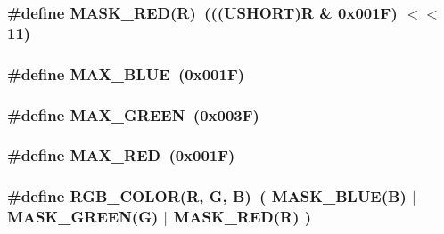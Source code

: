 \subsubsection[{MASK\_\-RED}]{\setlength{\rightskip}{0pt plus 5cm}\#define MASK\_\-RED(R)~(((USHORT)R \& 0x001F) $<$$<$ 11)}\label{colorspace_8h_ab7804c4ff0e1de4a1d3995e5acf43f52}
\subsubsection[{MAX\_\-BLUE}]{\setlength{\rightskip}{0pt plus 5cm}\#define MAX\_\-BLUE~(0x001F)}\label{colorspace_8h_af52029ba81d9147df7146fe94035f92a}
\subsubsection[{MAX\_\-GREEN}]{\setlength{\rightskip}{0pt plus 5cm}\#define MAX\_\-GREEN~(0x003F)}\label{colorspace_8h_a91990e7d5a79c882024a62d99ef5487e}
\subsubsection[{MAX\_\-RED}]{\setlength{\rightskip}{0pt plus 5cm}\#define MAX\_\-RED~(0x001F)}\label{colorspace_8h_a3b064aa13c00b6ee4da701437561e631}
\subsubsection[{RGB\_\-COLOR}]{\setlength{\rightskip}{0pt plus 5cm}\#define RGB\_\-COLOR(R, \/  G, \/  B)~( MASK\_\-BLUE(B) $|$ MASK\_\-GREEN(G) $|$ MASK\_\-RED(R) )}\label{colorspace_8h_aafb78bc1b3220dd457c601fe7631783a}
